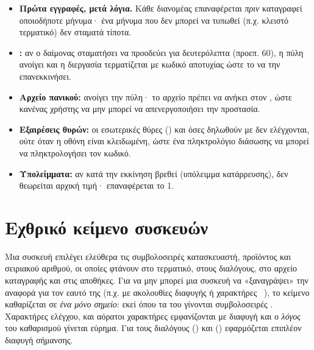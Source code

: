 \begin{itemize}
  \item \textbf{Πρώτα εγγραφές, μετά λόγια.} Κάθε διανομέας επαναφέρεται
        \emph{πριν} καταγραφεί οποιοδήποτε μήνυμα· ένα μήνυμα που δεν μπορεί να
        τυπωθεί (π.χ. κλειστό τερματικό) δεν σταματά τίποτα.
  \item \textbf{:} αν ο δαίμονας σταματήσει να προοδεύει για
         δευτερόλεπτα (προεπ. 60), η πύλη ανοίγει και η
        διεργασία τερματίζεται με κωδικό αποτυχίας ώστε το  να την
        επανεκκινήσει.
  \item \textbf{Αρχείο πανικού:}  ανοίγει την
        πύλη· το αρχείο πρέπει να ανήκει στον , ώστε κανένας χρήστης να
        μην μπορεί να απενεργοποιήσει την προστασία.
  \item \textbf{Εξαιρέσεις θυρών:} οι εσωτερικές θύρες ()
        και όσες δηλωθούν με  δεν ελέγχονται, ούτε όταν η
        οθόνη είναι κλειδωμένη, ώστε ένα πληκτρολόγιο διάσωσης να μπορεί να
        πληκτρολογήσει τον κωδικό.
  \item \textbf{Υπολείμματα:} αν κατά την εκκίνηση βρεθεί 
        (υπόλειμμα κατάρρευσης), δεν θεωρείται αρχική τιμή· επαναφέρεται το 1.
\end{itemize}

\section{Εχθρικό κείμενο συσκευών}
\label{sec:design-text}

Μια συσκευή επιλέγει ελεύθερα τις συμβολοσειρές κατασκευαστή, προϊόντος και
σειριακού αριθμού, οι οποίες φτάνουν στο τερματικό, στους διαλόγους, στο αρχείο
καταγραφής  και στις αποθήκες. Για να μην μπορεί μια συσκευή να
«ξαναγράψει» την αναφορά για τον εαυτό της (π.χ. με ακολουθίες διαφυγής
 ή χαρακτήρες ~\cite{boucher2023trojansource}), το κείμενο
καθαρίζεται σε \emph{ένα μόνο σημείο}: εκεί όπου τα  του 
γίνονται συμβολοσειρές . Χαρακτήρες ελέγχου,  και αόρατοι
χαρακτήρες εμφανίζονται με διαφυγή και ο \emph{λόγος} του καθαρισμού γίνεται
εύρημα. Για τους διαλόγους  () και 
() εφαρμόζεται επιπλέον διαφυγή σήμανσης.
